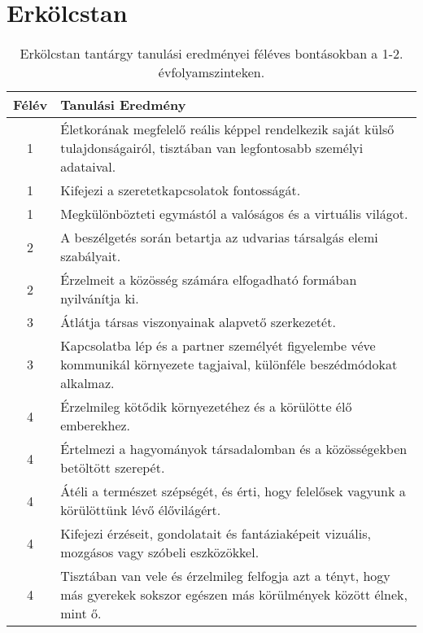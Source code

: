         \section{Erkölcstan}

       
           \begin{longtable}{c | p{12cm} }
            \caption[Erkölcstan 1-2.]{Erkölcstan tantárgy tanulási eredményei féléves bontásokban a 1-2. évfolyamszinteken. }  \\

            \textbf{Félév} & \textbf{Tanulási Eredmény} \\
            \hline
            \endhead
                                
                                          1 &  Életkorának megfelelő reális képpel rendelkezik saját külső tulajdonságairól, tisztában van legfontosabb személyi adataival. \\ \hline
                                          1 &  Kifejezi a szeretetkapcsolatok fontosságát. \\ \hline
                                          1 &  Megkülönbözteti egymástól a valóságos és a virtuális világot. \\ \hline
                                      
                                
                                          2 &  A beszélgetés során betartja az udvarias társalgás elemi szabályait. \\ \hline
                                          2 &  Érzelmeit a közösség számára elfogadható formában nyilvánítja ki. \\ \hline
                                      
                                
                                          3 &  Átlátja társas viszonyainak alapvető szerkezetét. \\ \hline
                                          3 &  Kapcsolatba lép és a partner személyét figyelembe véve kommunikál környezete tagjaival, különféle beszédmódokat alkalmaz. \\ \hline
                                      
                                
                                          4 &  Érzelmileg kötődik környezetéhez és a körülötte élő emberekhez. \\ \hline
                                          4 &  Értelmezi a hagyományok társadalomban és a közösségekben betöltött szerepét. \\ \hline
                                          4 &  Átéli a természet szépségét, és érti, hogy felelősek vagyunk a körülöttünk lévő élővilágért. \\ \hline
                                          4 &  Kifejezi érzéseit, gondolatait és fantáziaképeit vizuális, mozgásos vagy szóbeli eszközökkel. \\ \hline
                                          4 &  Tisztában van vele és érzelmileg felfogja azt a tényt, hogy más gyerekek sokszor egészen más körülmények között élnek, mint ő. \\ \hline
                                      
                        \end{longtable}

